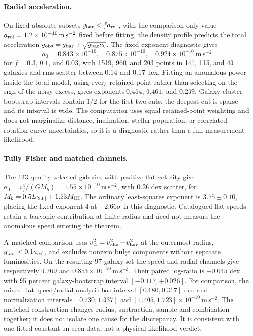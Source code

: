 \documentclass[11pt]{article}
\begin{document}
\paragraph{Radial acceleration.}
On fixed absolute subsets \(g_{\rm bar}<f a_{\rm ref}\), with the
comparison-only value
\(a_{\rm ref}=1.2\times10^{-10}\,\mathrm{m\,s^{-2}}\) fixed before fitting,
the density profile predicts the total acceleration
\(g_{\rm obs}=g_{\rm bar}+\sqrt{g_{\rm bar}a_0}\). The fixed-exponent
diagnostic gives
\[
a_0=0.843\times10^{-10},\quad 0.875\times10^{-10},\quad 0.924\times10^{-10}\ \mathrm{m\,s^{-2}}
\]
for \(f=0.3\), \(0.1\), and \(0.03\), with 1519, 960, and 203 points in 141,
115, and 40 galaxies and rms scatter between \(0.14\) and \(0.17\) dex. Fitting
an anomalous power inside the total model, using every retained point rather
than selecting on the sign of the noisy excess, gives exponents \(0.454\),
\(0.461\), and \(0.239\). Galaxy-cluster bootstrap intervals contain
\(1/2\) for the first two cuts; the deepest cut is sparse and its interval is
wide. The computation uses equal retained-point weighting and does not
marginalize distance, inclination, stellar-population, or correlated
rotation-curve uncertainties, so it is a diagnostic rather than a full
measurement likelihood.

\paragraph{Tully--Fisher and matched channels.}
The 123 quality-selected galaxies with positive flat velocity give
\(a_0=v_f^4/(GM_b)=1.55\times10^{-10}\,\mathrm{m\,s^{-2}}\), with
\(0.26\) dex scatter, for \(M_b=0.5L_{[3.6]}+1.33M_{\rm HI}\).
The ordinary least-squares exponent is \(3.75\pm0.10\), placing the
fixed exponent \(4\) at \(+2.66\sigma\) in this diagnostic. Catalogued
flat speeds retain a baryonic contribution at finite radius and need not
measure the anomalous speed entering the theorem.

A matched comparison uses
\(v_A^2=v_{\rm obs}^2-v_{\rm bar}^2\) at the outermost radius,
\(g_{\rm bar}<0.1a_{\rm ref}\), and excludes nonzero bulge components
without separate luminosities. On the resulting 97-galaxy set the speed
and radial channels give respectively \(0.769\) and
\(0.853\times10^{-10}\,\mathrm{m\,s^{-2}}\). Their paired log-ratio
is \(-0.045\) dex with 95 percent galaxy-bootstrap interval
\([-0.117,+0.026]\). For comparison, the mixed flat-speed/radial analysis
has interval \([0.180,0.317]\) dex and normalization intervals
\([0.730,1.037]\) and \([1.405,1.723]\times10^{-10}\,\mathrm{m\,s^{-2}}\).
The matched construction changes radius, subtraction, sample and combination
together; it does not isolate one cause for the discrepancy. It is consistent
with one fitted constant on seen data, not a physical likelihood verdict.
\end{document}
